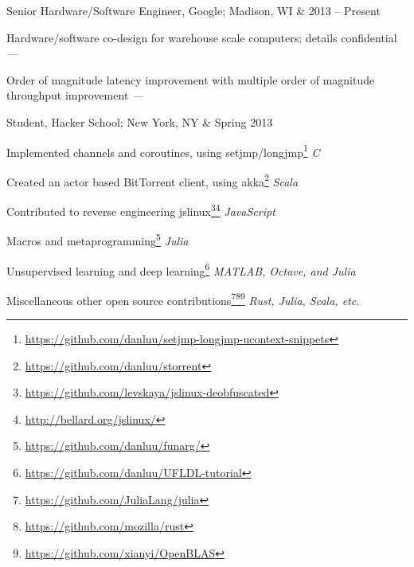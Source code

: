\documentclass[letterpaper]{scrartcl}
\begin{document}
\begin{list1}

\item \begin{tabular1bold} Senior Hardware/Software Engineer, Google; Madison, WI & 2013 -- Present \end{tabular1bold}

  \begin{list2}
  \item Hardware/software co-design for warehouse scale computers; details confidential \hfill \emph{---} %
  \item Order of magnitude latency improvement with multiple order of magnitude throughput improvement \hfill \emph{---}
  \end{list2}

\item \begin{tabular1bold} Student, Hacker School; New York, NY & Spring 2013 \end{tabular1bold}

  \begin{list2}
  \item Implemented channels and coroutines, using setjmp/longjmp\footnote{\href{https://github.com/danluu/setjmp-longjmp-ucontext-snippets}{https://github.com/danluu/setjmp-longjmp-ucontext-snippets}} \hfill \emph{C} 
  \item Created an actor based BitTorrent client, using akka\footnote{\href{https://github.com/danluu/storrent}{https://github.com/danluu/storrent}}             \hfill \emph{Scala}
  \item Contributed to reverse engineering jslinux\footnote{\href{https://github.com/levskaya/jslinux-deobfuscated}{https://github.com/levskaya/jslinux-deobfuscated}}\footnote{\href{http://bellard.org/jslinux/}{http://bellard.org/jslinux/}}    \hfill \emph {JavaScript}
  \item Macros and metaprogramming\footnote{\href{https://github.com/danluu/funarg/}{https://github.com/danluu/funarg/}} \hfill \emph {Julia} %
  \item Unsupervised learning and deep learning\footnote{\href{https://github.com/danluu/UFLDL-tutorial}{https://github.com/danluu/UFLDL-tutorial}} \hfill \emph {MATLAB, Octave, and Julia} %
  \item Miscellaneous other open source contributions\footnote{\href{https://github.com/JuliaLang/julia}{https://github.com/JuliaLang/julia}}\footnote{\href{https://github.com/mozilla/rust}{https://github.com/mozilla/rust}}\footnote{\href{https://github.com/xianyi/OpenBLAS}{https://github.com/xianyi/OpenBLAS}} \hfill \emph {Rust, Julia, Scala, etc.}
  \end{list2}


\end{list1}
\end{document}
